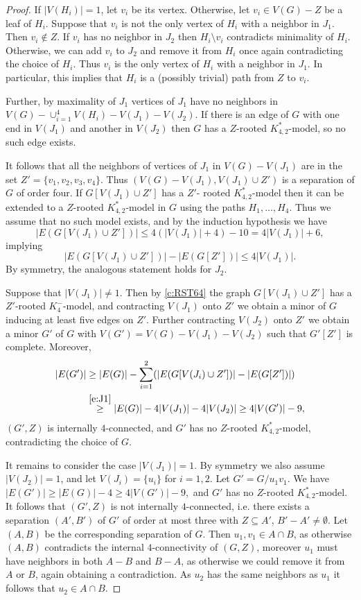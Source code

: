 \documentclass[reqno,final,12pt]{amsart}
\begin{document}
{\begin{proof}
	If $|V(H_i)|=1$, let $v_i$ be its vertex. Otherwise, let $v_i \in V(G) - Z$ be a leaf of $H_i$. Suppose that $v_i$ is not the only vertex of $H_i$ with a neighbor in $J_1$. Then $v_i \not \in Z$. If $v_i$ has no neighbor in $J_{2}$ then $H_i \setminus v_i$ contradicts minimality of $H_i$. Otherwise, we can  add $v_i$ to $J_{2}$ and remove it from $H_i$ once again contradicting the choice of $H_i$. 	Thus $v_i$ is  the only vertex of $H_i$ with a neighbor in $J_1$. In particular, this implies that $H_i$ is a (possibly trivial) path from $Z$ to $v_i$. 
	
	Further, by maximality of $J_1$ vertices of $J_1$ have no neighbors in $V(G) - \cup_{i=1}^4 V(H_i) - V(J_1) -V(J_2)$. If there is an edge of $G$ with one end in $V(J_1)$ and another in $V(J_2)$ then $G$ has a   $Z$-rooted $K^*_{4,2}$-model, so  no such edge exists. 
	
	It follows that all the neighbors of vertices of  $J_1$ in $V(G) -V(J_1)$ are in the set $Z'=\{v_1,v_2,v_3,v_4\}$. Thus $(V(G) - V(J_1), V(J_1) \cup Z')$ is a separation of $G$ of order four. 	 If $G[V(J_1) \cup Z']$ has a $Z'$- rooted $K^*_{4,2}$-model then it can be extended to a  $Z$-rooted $K^*_{4,2}$-model in $G$ using the paths $H_1,\ldots, H_4$. Thus we assume that no such model exists, and by the induction hypothesis we have $$|E(G[V(J_1) \cup Z'])|  \leq 4(|V(J_1)|+4)-10 =  4|V(J_1)|+ 6,$$ implying \begin{equation}\label{e:J1} |E(G[V(J_1) \cup Z'])|- |E(G[Z'])| \leq 4|V(J_1)|.\end{equation}
	By symmetry, the analogous statement holds for $J_2$.
	
	Suppose that $|V(J_1)| \neq 1$. Then by \cref{c:RST64} the graph  $G[V(J_1) \cup Z']$ has a $Z'$-rooted $K^-_4$-model, and contracting $V(J_1)$ onto $Z'$ we obtain a minor of $G$ inducing at least five edges on $Z'$. Further contracting $V(J_2)$ onto $Z'$ we obtain a minor $G'$ of $G$ with $V(G')=V(G)-V(J_1)-V(J_2)$ such that $G'[Z']$ is complete. Moreover,  \begin{align*}|E(G')| &\geq |E(G)| - \sum_{i=1}^2(|E(G[V(J_i) \cup Z'])|- |E(G[Z'])|) \\ &\stackrel{\eqref{e:J1}}{\geq} |E(G)| - 4|V(J_1)|- 4|V(J_2)| \geq 4|V(G')|-9, \end{align*}
	$(G',Z)$ is internally $4$-connected, and $G'$ has no $Z$-rooted $K^*_{4,2}$-model, contradicting the choice of $G$. 
	
	It remains to consider the case  $|V(J_1)| = 1$. By symmetry we also assume $|V(J_2)|=1$, and let $V(J_i)=\{u_i\}$ for $i=1,2$. Let $G'=G/u_1v_1$. We have $|E(G')| \geq |E(G)|-4 \geq 4|V(G')|-9,$ and $G'$ has no $Z$-rooted $K^*_{4,2}$-model. It follows that $(G',Z)$ is not internally $4$-connected, i.e. there exists a separation $(A',B')$ of $G'$ of order at most three with $Z \subseteq A'$, $B'-A' \neq \emptyset$. Let $(A,B)$ be the corresponding separation of $G$. Then $u_1,v_1 \in A \cap B$,  as otherwise  $(A,B)$ contradicts the internal $4$-connectivity of $(G,Z)$, moreover $u_1$ must have neighbors in both  $A-B$ and $B-A$, as otherwise we could remove it from $A$ or $B$, again obtaining a contradiction. As $u_2$ has the same neighbors as $u_1$ it follows that $u_2 \in A \cap B$. 
	

\end{proof}}
\end{document}
